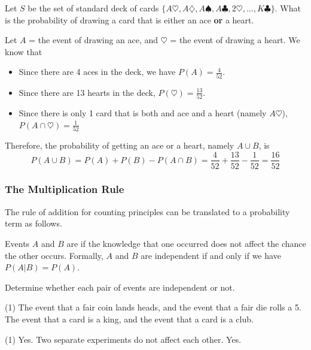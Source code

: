  
\begin{frame}[t]
\begin{ex} 
 Let $S$ be the set of standard deck of cards $\{A\heartsuit, A\diamondsuit, A\spadesuit, A\clubsuit, 2\heartsuit, \ldots, K\clubsuit\}$. \pause What is the probability of drawing a card that is either an ace \textbf{or} a heart.
\end{ex} 
\begin{sol}
Let $A$ = the event of drawing an ace, and $\heartsuit$ = the event of drawing a heart. We know that 
\begin{itemize}
\item Since there are 4 aces in the deck, we have $P(A) = \frac{4}{52}$.
\item Since there are 13 hearts in the deck, $P(\heartsuit) = \frac{13}{52}$. \pause
\item Since there is only 1 card that is both and ace and a heart (namely $A\heartsuit$), $P(A \cap \heartsuit) = \frac{1}{52}$
\end{itemize}
Therefore, the probability of getting an ace or a heart, namely $A \cup B$, is
\[P(A \cup B) = P(A) + P(B) - P(A \cap B) = \frac{4}{52} + \frac{13}{52} - \frac{1}{52} = \frac{16}{52}\]
\end{sol}
\end{frame}


\begin{frame}
\frametitle{The Multiplication Rule}
The rule of addition for counting principles can be translated to a probability term as follows.
\begin{defn}{}{}
Events $A$ and $B$ are  if the knowledge that one occurred does not affect the chance the other occurs. Formally, $A$ and $B$ are independent if and only if we have $P(A|B) = P(A).$
\end{defn}
\end{frame}

\begin{frame}[t]
\begin{ex}
Determine whether each pair of events are independent or not.
\begin{tasks}(1)
\task The event that a fair coin lands heads, and the event that a fair die rolls a 5.
\task The event that a card is a king, and the event that a card is a club.
\end{tasks}
\end{ex}
\begin{sol}
\begin{tasks}(1)
\task Yes. Two separate experiments do not affect each other.
\task Yes. 
\end{tasks}
\end{sol}
\end{frame}


